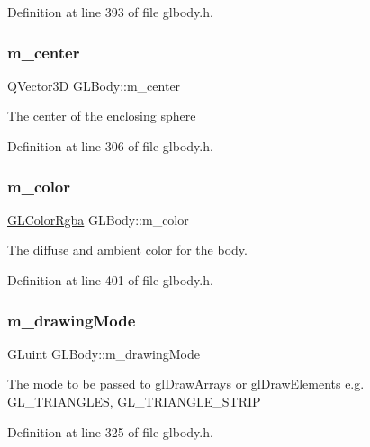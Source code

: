 Definition at line 393 of file glbody.\+h.

\mbox{\label{class_g_l_body_afffadedad59d067a5fd8cd24d82ab95b}} 
\subsubsection{\texorpdfstring{m\_center}{m\_center}}
{\footnotesize\ttfamily Q\+Vector3D G\+L\+Body\+::m\+\_\+center\hspace{0.3cm}{\ttfamily [protected]}}

The center of the enclosing sphere 

Definition at line 306 of file glbody.\+h.

\mbox{\label{class_g_l_body_a267b5c0fbe5752370197012975663dca}} 
\subsubsection{\texorpdfstring{m\_color}{m\_color}}
{\footnotesize\ttfamily \mbox{\hyperlink{class_g_l_color_rgba}{G\+L\+Color\+Rgba}} G\+L\+Body\+::m\+\_\+color\hspace{0.3cm}{\ttfamily [protected]}}

The diffuse and ambient color for the body. 

Definition at line 401 of file glbody.\+h.

\mbox{\label{class_g_l_body_a3c6c3d3afde4a1990c3cc97976fd5bd8}} 
\subsubsection{\texorpdfstring{m\_drawingMode}{m\_drawingMode}}
{\footnotesize\ttfamily G\+Luint G\+L\+Body\+::m\+\_\+drawing\+Mode\hspace{0.3cm}{\ttfamily [protected]}}

The mode to be passed to gl\+Draw\+Arrays or gl\+Draw\+Elements e.\+g. G\+L\+\_\+\+T\+R\+I\+A\+N\+G\+L\+ES, G\+L\+\_\+\+T\+R\+I\+A\+N\+G\+L\+E\+\_\+\+S\+T\+R\+IP 

Definition at line 325 of file glbody.\+h.

